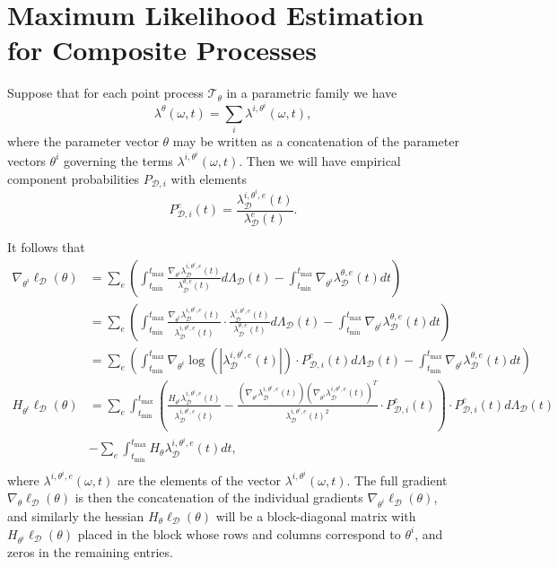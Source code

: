 \documentclass[honours,12pt]{unswthesis}
\numberwithin{equation}{section}
\begin{document}
\section{Maximum Likelihood Estimation for Composite Processes}
Suppose that for each point process $\mathcal{T}_\theta$ in a parametric family we have
$$\lambda^\theta(\omega,t)=\sum_i \lambda^{i,\theta^i}(\omega,t),$$
where the parameter vector $\theta$ may be written as a concatenation of the parameter vectors $\theta^i$ governing the terms $\lambda^{i,\theta^i}(\omega,t)$. Then we will have empirical component probabilities $P_{\mathcal{D},i}$ with elements
$$P_{\mathcal{D},i}^e(t) = \frac{\lambda_\mathcal{D}^{i,\theta^i,e}(t)}{\lambda_\mathcal{D}^e(t)}.$$

It follows that
\begin{equation}
	\begin{align}
		\nabla_{\theta^i} \ell_\mathcal{D}(\theta) &= \sum_e\left(\int_{t_\mathrm{min}}^{t_\mathrm{max}} \frac{\nabla_{\theta^i} \lambda_\mathcal{D}^{i,\theta^i,e}(t)}{\lambda_\mathcal{D}^{\theta,e}(t)} d\Lambda_\mathcal{D}(t)-\int_{t_\mathrm{min}}^{t_\mathrm{max}}\nabla_{\theta^i} \lambda_\mathcal{D}^{\theta,e}(t) dt\right) \\
		&= \sum_e\left(\int_{t_\mathrm{min}}^{t_\mathrm{max}} \frac{\nabla_{\theta^i} \lambda_\mathcal{D}^{i,\theta^i,e}(t)}{\lambda_\mathcal{D}^{i,\theta^i,e}(t)}\cdot\frac{\lambda_\mathcal{D}^{i,\theta^i,e}(t)}{\lambda_\mathcal{D}^{\theta,e}(t)} d\Lambda_\mathcal{D}(t)-\int_{t_\mathrm{min}}^{t_\mathrm{max}}\nabla_{\theta^i} \lambda_\mathcal{D}^{\theta,e}(t) dt\right) \\
		&= \sum_e\left(\int_{t_\mathrm{min}}^{t_\mathrm{max}} \nabla_{\theta^i} \log\left(\left\vert \lambda_\mathcal{D}^{i,\theta^i,e}(t) \right\vert\right)\cdot P_{\mathcal{D},i}^e(t) d\Lambda_\mathcal{D}(t)-\int_{t_\mathrm{min}}^{t_\mathrm{max}}\nabla_{\theta^i} \lambda_\mathcal{D}^{\theta,e}(t) dt\right) \\
		H_{\theta^i} \ell_\mathcal{D}(\theta) &= \sum_e \int_{t_\mathrm{min}}^{t_\mathrm{max}} \left( \frac{H_{\theta^i} \lambda_\mathcal{D}^{i,\theta^i,e}(t)}{\lambda_\mathcal{D}^{i,\theta^i,e}(t)} - \frac{ \left(\nabla_{\theta^i}\lambda_\mathcal{D}^{i,\theta^i,e}(t)\right) \left(\nabla_{\theta^i}\lambda_\mathcal{D}^{i,\theta^i,e}(t)\right)^T  }{\lambda_\mathcal{D}^{i,\theta^i,e}(t)^2} \cdot P_{\mathcal{D},i}^e(t)\right)\cdot P_{\mathcal{D},i}^e(t) d\Lambda_\mathcal{D}(t) \\ &- \sum_e\int_{t_\mathrm{min}}^{t_\mathrm{max}} H_\theta \lambda_\mathcal{D}^{i,\theta^i,e}(t) dt,\\ 
	\end{align}\label{eq:derivatives}
\end{equation}
where $\lambda^{i,\theta^i,e}(\omega,t)$ are the elements of the vector $\lambda^{i,\theta^i}(\omega,t)$. The full gradient $\nabla_\theta \ell_\mathcal{D}(\theta)$ is then the concatenation of the individual gradients $\nabla_{\theta^i} \ell_\mathcal{D}(\theta)$, and similarly the hessian $H_\theta \ell_\mathcal{D}(\theta)$ will be a block-diagonal matrix with $H_{\theta^i}\ell_\mathcal{D}(\theta)$ placed in the block whose rows and columns correspond to $\theta^i$, and zeros in the remaining entries.
\end{document}
